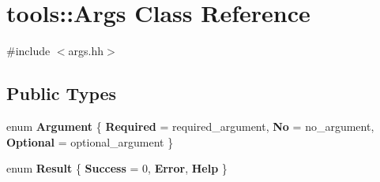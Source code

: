 \section{tools\-:\-:Args Class Reference}
\label{classtools_1_1Args}


{\ttfamily \#include $<$args.\-hh$>$}

\subsection*{Public Types}
\begin{DoxyCompactItemize}
\item 
enum {\bfseries Argument} \{ {\bfseries Required} = required\-\_\-argument, 
{\bfseries No} = no\-\_\-argument, 
{\bfseries Optional} = optional\-\_\-argument
 \}
\item 
enum {\bf Result} \{ {\bfseries Success} = 0, 
{\bfseries Error}, 
{\bf Help}
 \}
\end{DoxyCompactItemize}
